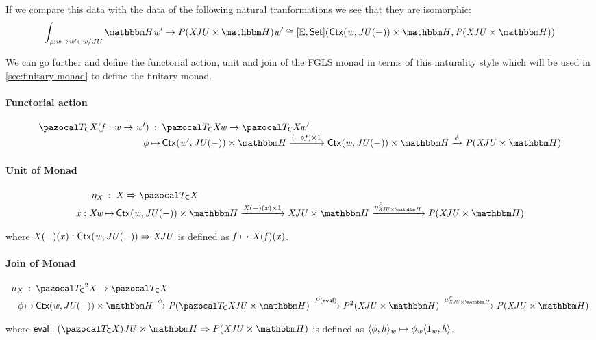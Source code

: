 \noindent
 If we compare this data with the data of the following natural tranformations we see that they are isomorphic:
\[\begin{array}{c}
 \End{\rho : \vw \to \vw' \in \commaC\vw{\vJ\vU}}\heapF\vw' \to \vP(\vX\vJ\vU \times \heapF)\vw' \iso
    \homF{\funC\initC\setC}{\homF\ctxC\vw{\vJ\vU(\dash)} \times \heapF}{\vP(\vX\vJ\vU \times \heapF)}
\end{array}\]

We can go further and define the functorial action, unit and join of the FGLS monad in terms of this naturality style
which will be used in \cref{sec:finitary-monad} to define the finitary monad.

\paragraph{Functorial action}

\[\begin{array}{r@{\,}c@{\,}l}
    \monFLSCtx\vX(\vf : \vw \to \vw') & : & \monFLSCtx\vX\vw \to \monFLSCtx\vX\vw' \\
    \phi & \mapsto &  \homF\ctxC{\vw'}{\vJ\vU(\dash)} \times \heapF \xto{(\dash \comp \vf) \times 1} 
                      \homF\ctxC\vw{\vJ\vU(\dash)} \times \heapF \xto\phi \vP(\vX\vJ\vU \times \heapF)
\end{array}\]

\paragraph{Unit of Monad}

\[\begin{array}{r@{\,}c@{\,}l}
    \eta_\vX & : & \vX \To \monFLSCtx\vX \\
    \vx : \vX\vw & \mapsto & \homF\ctxC\vw{\vJ\vU(\dash)} \times \heapF \xto{\vX(\dash)(\vx) \times 1} \vX\vJ\vU \times \heapF 
                                                                                          \xto{\eta^\vP_{\vX\vJ\vU \times \heapF}} \vP(\vX\vJ\vU \times \heapF)
\end{array}\]

where $\mathit{X}(-)(\mathit{x}) : {\mathsf{Ctx}}({\mathit{w}}, {\mathit{J}\mathit{U}(-)}) \Rightarrow \mathit{X}\mathit{J}\mathit{U}$ is defined as $\mathit{f} \mapsto \mathit{X}(\mathit{f})(\mathit{x})$.

\paragraph{Join of Monad}

\[\begin{array}{r@{\,}c@{\,}l}
    \mu_\vX & : & \Exp\monFLSCtx2\vX \to \monFLSCtx\vX \\
    \phi & \mapsto & \homF\ctxC\vw{\vJ\vU(\dash)} \times \heapF \xto\phi \vP(\monFLSCtx\vX\vJ\vU \times \heapF) \xto{\vP(\eval)} \Exp\vP2(\vX\vJ\vU \times \heapF)
    \xto{\mu^\vP_{\vX\vJ\vU \times \heapF}} \vP(\vX\vJ\vU \times \heapF)
\end{array}\]

where $\eval : (\monFLSCtx\vX)\vJ\vU \times \heapF \To \vP(\vX\vJ\vU \times \heapF)$ is defined as $\langle \phi , \mathit{h} \rangle_{\mathit{w}} \mapsto \phi_{\mathit{w}}\langle 1_{\mathit{w}} , \mathit{h} \rangle$.

